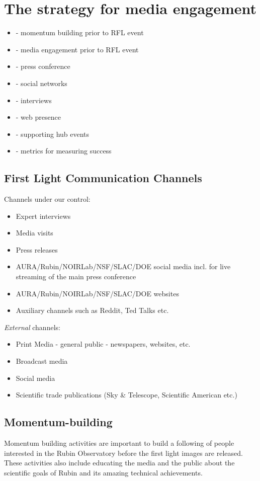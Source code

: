 \section{The strategy for media engagement} \label{sec:strategy}
\begin{itemize}
\item - momentum building prior to RFL event
\item - media engagement prior to RFL event
\item - press conference
\item - social networks
\item - interviews
\item - web presence
\item - supporting hub events
\item - metrics for measuring success
\end{itemize}

\subsection{First Light Communication Channels}
Channels under our control:

\begin{itemize}
\item Expert interviews
\item Media visits
\item Press releases
\item AURA/Rubin/NOIRLab/NSF/SLAC/DOE social media incl. for live streaming of the main press conference
\item AURA/Rubin/NOIRLab/NSF/SLAC/DOE websites
\item Auxiliary channels such as Reddit, Ted Talks etc.
\end{itemize}

\emph{External} channels:
\begin{itemize}
\item Print Media - general public - newspapers, websites, etc.
\item Broadcast media
\item Social media
\item Scientific trade publications (Sky \& Telescope, Scientific American etc.)
\end{itemize}


\subsection{Momentum-building}
Momentum building activities are important to build a following of people interested in the Rubin Observatory before the first light images are released. These activities also include educating the media and the public about the scientific goals of Rubin and its amazing technical achievements.

